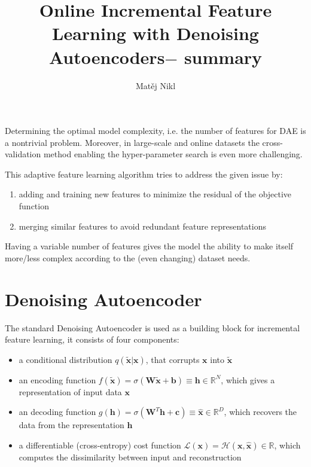 \documentclass[a4paper,twocolumn]{article}
\title{Online Incremental Feature Learning with Denoising Autoencoders$-$ summary}
\author{Matěj Nikl}
\renewcommand{\H}{\mathcal{H}}
\renewcommand{\L}{\mathcal{L}}
\begin{document}
\maketitle
\noindent
Determining the optimal model complexity, i.e. the number of features for DAE is a nontrivial problem. Moreover, in large-scale and online datasets the cross-validation method enabling the hyper-parameter search is even more challenging.

This adaptive feature learning algorithm tries to address the given issue by:
\begin{enumerate}
    \item adding and training new features to minimize the residual of the objective function
    \item merging similar features to avoid redundant feature representations
\end{enumerate}
Having a variable number of features gives the model the ability to make itself more/less complex according to the (even changing) dataset needs.

\section{Denoising Autoencoder}
The standard Denoising Autoencoder is used as a building block for incremental feature learning, it consists of four components:
\begin{itemize}
    \item a conditional distribution $q(\mathbf{\widetilde{x}|x})$, that corrupts $\mathbf{x}$ into $\mathbf{\widetilde{x}}$
    \item an encoding function $f(\mathbf{\widetilde{x}}) = \sigma(\mathbf{W\widetilde{x} + b}) \equiv \mathbf{h} \in \mathbb{R}^N$, which gives a representation of input data $\mathbf{x}$
    \item an decoding function $g(\mathbf{h}) = \sigma(\mathbf{W}^T\mathbf{h + c}) \equiv \mathbf{\widehat{x}} \in \mathbb{R}^D$, which recovers the data from the representation $\mathbf{h}$
    \item a differentiable (cross-entropy) cost function $\L(\mathbf{x}) = \H(\mathbf{x}, \mathbf{\widehat{x}}) \in \mathbb{R}$, which computes the dissimilarity between input and reconstruction
\end{itemize}
\end{document}
